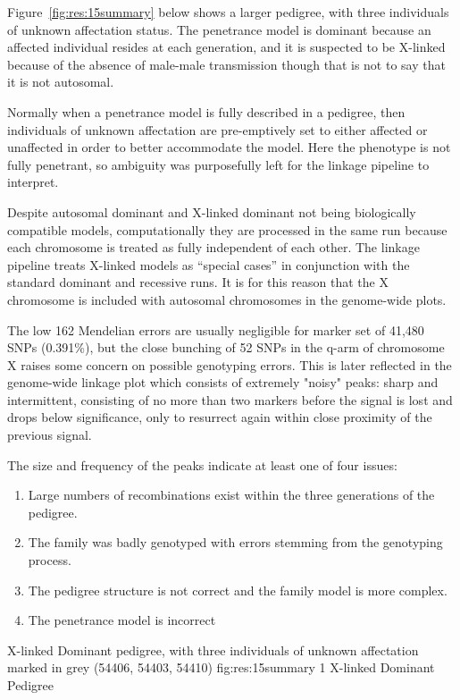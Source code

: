 Figure~\ref{fig:res:15summary} below shows a larger pedigree, with three individuals of unknown affectation status.  The penetrance model is dominant because an affected individual resides at each generation, and it is suspected to be X-linked because of the absence of male-male transmission though that is not to say that it is not autosomal.

Normally when a penetrance model is fully described in a pedigree, then individuals of unknown affectation are pre-emptively set to either affected or unaffected in order to better accommodate the model.  Here the phenotype is not fully penetrant, so ambiguity was purposefully left for the linkage  pipeline to interpret.

Despite autosomal dominant and X-linked dominant not being biologically compatible models, computationally they are processed in the same run because each chromosome is treated as fully independent of each other. The linkage pipeline treats X-linked models as “special cases” in conjunction with the standard dominant and recessive runs. It is for this reason that the X chromosome is included with autosomal chromosomes in the genome-wide plots.

The low 162 Mendelian errors are usually negligible for marker set of 41,480 SNPs (0.391\%), but the close bunching of 52 SNPs in the q-arm of chromosome X raises some concern on possible genotyping errors. This is later reflected in the genome-wide linkage plot which consists of extremely "noisy" peaks: sharp and intermittent, consisting of no more than two markers before the signal is lost and drops below significance, only to resurrect again within close proximity of the previous signal.

The size and frequency of the peaks indicate at least one of four issues:
\begin{spacing}{1.2}
\begin{enumerate}
\item{Large numbers of recombinations exist within the three generations of the pedigree.}
\item{The family was badly genotyped with errors stemming from the genotyping process.}
\item{The pedigree structure is not correct and the family model is more complex.}
\item{The penetrance model is incorrect}
\end{enumerate}
\end{spacing}

{X-linked Dominant pedigree, with three individuals of unknown affectation marked in grey (54406, 54403, 54410)}
{fig:res:15summary}
{1}
{X-linked Dominant Pedigree}

